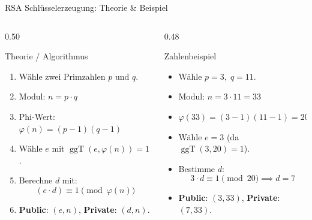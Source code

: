 \begin{frame}{RSA Schlüsselerzeugung: Theorie \& Beispiel}
	\begin{columns}[T]
		\begin{column}{0.50\textwidth}
			\begin{block}{Theorie / Algorithmus}
				{\scriptsize
					\begin{enumerate}
						\item Wähle zwei Primzahlen $p$ und $q$.
						\item Modul: $n = p \cdot q$
						\item Phi-Wert: $\varphi(n) = (p-1)(q-1)$
						\item Wähle $e$ mit $\operatorname{ggT}(e, \varphi(n)) = 1$.
						\item Berechne $d$ mit:
						      \[ (e \cdot d) \equiv 1 \pmod{\varphi(n)} \]
						\item \textbf{Public}: $(e, n)$, \textbf{Private}: $(d, n)$.
					\end{enumerate}
				}
			\end{block}
		\end{column}
		\begin{column}{0.48\textwidth}
			\begin{exampleblock}{Zahlenbeispiel}
				{\scriptsize
					\begin{itemize}
						\item Wähle $p = 3, \; q = 11$.
						\item Modul: $n = 3 \cdot 11 = 33$
						\item $\varphi(33) = (3-1)(11-1) = 20$
						\item Wähle $e = 3$ (da $\operatorname{ggT}(3, 20) = 1$).
						\item Bestimme $d$:
						      \[ 3 \cdot d \equiv 1 \pmod{20} \implies d = 7 \]
						\item \textbf{Public}: $(3, 33)$, \textbf{Private}: $(7, 33)$.
					\end{itemize}
				}
			\end{exampleblock}
		\end{column}
	\end{columns}
\end{frame}

